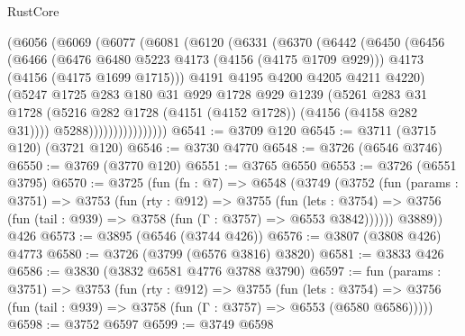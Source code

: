 \begin{lexlean}{RustCore}
\begin{coremodule}
                (@6056
                  (@6069
                    (@6077
                      (@6081
                        (@6120
                          (@6331
                            (@6370
                              (@6442
                                (@6450
                                  (@6456
                                    (@6466
                                      (@6476 @6480 @5223 @4173 (@4156 (@4175 @1709 @929)))
                                      @4173
                                      (@4156 (@4175 @1699 @1715)))
                                    @4191
                                    @4195
                                    @4200
                                    @4205
                                    @4211
                                    @4220)
                                  (@5247
                                    @1725
                                    @283
                                    @180
                                    @31
                                    @929
                                    @1728
                                    @929
                                    @1239
                                    (@5261
                                      @283
                                      @31
                                      @1728
                                      (@5216
                                        @282
                                        @1728
                                        (@4151 (@4152 @1728))
                                        (@4156 (@4158 @282 @31))))
                                    @5288))))))))))))))))
@6541 := @3709 @120
@6545 := @3711 (@3715 @120) (@3721 @120)
@6546 := @3730 @4770
@6548 := @3726 (@6546 @3746)
@6550 := @3769 (@3770 @120)
@6551 := @3765 @6550
@6553 := @3726 (@6551 @3795)
@6570 := @3725
    (fun (fn : @7) =>
    @6548
      (@3749
        (@3752
          (fun (params : @3751) =>
          @3753
            (fun (rty : @912) =>
            @3755
              (fun (lets : @3754) =>
              @3756 (fun (tail : @939) => @3758 (fun (Γ : @3757) => @6553 @3842))))))
        @3889))
    @426
@6573 := @3895 (@6546 (@3744 @426))
@6576 := @3807 (@3808 @426) @4773
@6580 := @3726 (@3799 (@6576 @3816) @3820)
@6581 := @3833 @426
@6586 := @3830 (@3832 @6581 @4776 @3788 @3790)
@6597 := fun (params : @3751) =>
  @3753
    (fun (rty : @912) =>
    @3755
      (fun (lets : @3754) =>
      @3756 (fun (tail : @939) => @3758 (fun (Γ : @3757) => @6553 (@6580 @6586)))))
@6598 := @3752 @6597
@6599 := @3749 @6598

\end{coremodule}
\end{lexlean}

